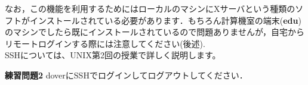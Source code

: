 \documentclass{jarticle}
\begin{document}
なお，この機能を利用するためにはローカルのマシンにXサーバという種類のソフトがインストールされている必要があります．もちろん計算機室の端末({\bf edu})のマシンでしたら既にインストールされているので問題ありませんが，自宅からリモートログインする際には注意してください(後述).\\

SSHについては、UNIX第2回の授業で詳しく説明します。

\vspace{1em}

\begin{itembox}[l]{\textbf{練習問題2}}
doverにSSHでログインしてログアウトしてください．
\end{itembox}



\end{document}
